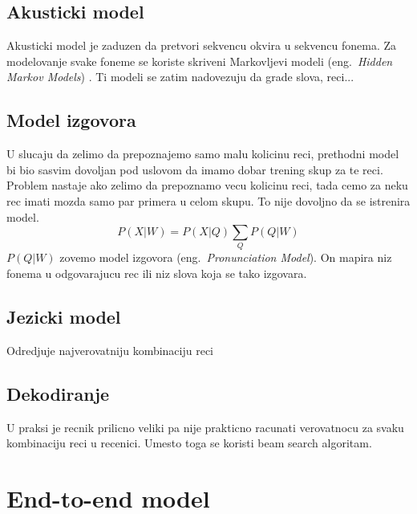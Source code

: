 \documentclass[a4paper]{article}
\begin{document}
\subsection{Akusticki model}
Akusticki model je zaduzen da pretvori sekvencu okvira u sekvencu fonema. %
Za modelovanje svake foneme se koriste skriveni Markovljevi modeli (eng.~{\em Hidden Markov Models}) \cite{rabiner1989hmm}.
Ti modeli se zatim nadovezuju da grade slova, reci...

\subsection{Model izgovora}
U slucaju da zelimo da prepoznajemo samo malu kolicinu reci, prethodni model bi bio sasvim dovoljan pod uslovom da imamo dobar trening skup za te reci.
Problem nastaje ako zelimo da prepoznamo vecu kolicinu reci, tada cemo za neku rec imati mozda samo par primera u celom skupu.
To nije dovoljno da se istrenira model. 
\begin{equation*}
  P(X|W) = P(X|Q) \sum_{Q} P(Q|W)
\end{equation*}
$P(Q|W)$ zovemo model izgovora (eng.~{\em Pronunciation Model}).
On mapira niz fonema u odgovarajucu rec ili niz slova koja se tako izgovara.

\subsection{Jezicki model}
Odredjuje najverovatniju kombinaciju reci

\subsection{Dekodiranje}
U praksi je recnik prilicno veliki pa nije prakticno racunati verovatnocu za svaku kombinaciju reci u recenici.
Umesto toga se koristi beam search algoritam.

\section{End-to-end model}
\end{document}
